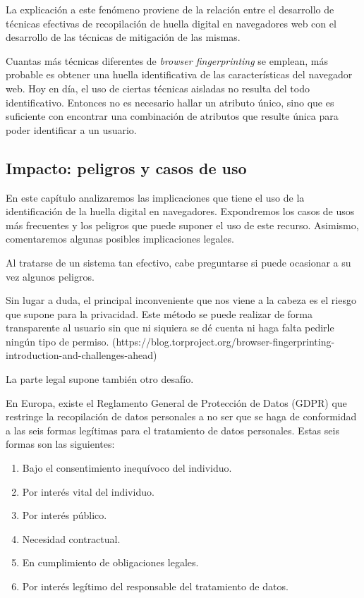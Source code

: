 La explicación a este fenómeno proviene de la relación entre el desarrollo de técnicas efectivas de recopilación de huella digital en navegadores web con el desarrollo de las técnicas de mitigación de las mismas. \par 

Cuantas más técnicas diferentes de \textit{browser fingerprinting} se emplean, más probable es obtener una huella identificativa de las características del navegador web. Hoy en día, el uso de ciertas técnicas aisladas no resulta del todo identificativo. Entonces no es necesario hallar un atributo único, sino que es suficiente con encontrar una combinación de atributos que resulte única para poder identificar a un usuario. \par

\subsection{Impacto: peligros y casos de uso}

En este capítulo analizaremos las implicaciones que tiene el uso de la identificación de la huella digital en navegadores. Expondremos los casos de usos más frecuentes y los peligros que puede suponer el uso de este recurso. Asimismo, comentaremos algunas posibles implicaciones legales. \par

Al tratarse de un sistema tan efectivo, cabe preguntarse si puede ocasionar a su vez algunos peligros. \par

Sin lugar a duda, el principal inconveniente que nos viene a la cabeza es el riesgo que supone para la privacidad. Este método se puede realizar de forma transparente al usuario sin que ni siquiera se dé cuenta ni haga falta pedirle ningún tipo de permiso.
(https://blog.torproject.org/browser-fingerprinting-introduction-and-challenges-ahead) \par 

La parte legal supone también otro desafío. \par

En Europa, existe el Reglamento General de Protección de Datos (GDPR) que restringe la recopilación de datos personales a no ser que se haga de conformidad a las seis formas legítimas para el tratamiento de datos personales. Estas seis formas son las siguientes: \par

\begin{enumerate}
\item Bajo el consentimiento inequívoco del individuo.
\item Por interés vital del individuo.
\item Por interés público.
\item Necesidad contractual.
\item En cumplimiento de obligaciones legales.
\item Por interés legítimo del responsable del tratamiento de datos.
\end{enumerate}

